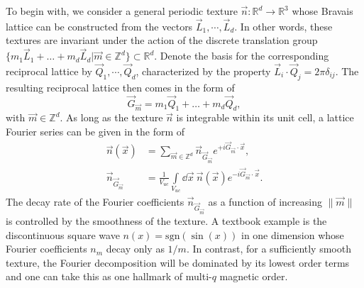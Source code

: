 \documentclass[submission, Phys]{SciPost}
\begin{document}
To begin with, we consider a general periodic texture $\vec{n}\colon \mathbb{R}^d\to \mathbb{R}^3$ whose Bravais lattice can be constructed from the vectors $\vec{L}_1, \cdots, \vec{L}_d$.
In other words, these textures are invariant under the action of the discrete translation group $\{m_1 \vec{L}_1 + \ldots  + m_d \vec{L}_d| \vec{m}\in\mathbb{Z}^d\} \subset \mathbb{R}^d$.
Denote the basis for the corresponding reciprocal lattice by 
$\vec{Q}_1, \cdots, \vec{Q}_d$, characterized by the property $\vec{L}_i \cdot \vec{Q}_j = 2\pi \delta_{ij}$. 
The resulting reciprocal lattice then comes in the form of
\begin{equation}
    \vec{G}_{\vec{m}} = m_1 \vec{Q}_1 + \ldots  + m_d \vec{Q}_d,
    \label{eq:Gm_definition}
\end{equation}
with $\vec{m} \in \mathbb{Z}^d$.
As long as the texture $\vec{n}$ is integrable within its unit cell, a lattice Fourier series can be given in the form  of
\begin{align}
  \vec{n}(\vec{x}) & =  \sum_{\vec{m} \in  \mathbb{Z}^d}  \vec{n}_{ \vec{G}_{\vec{m}}} e^{+ i  \vec{G}_{\vec{m}} \cdot \vec{x} },
  \\
   \vec{n}_{ \vec{G}_{\vec{m}}} & = \frac{1}{V_{uc}} \int\limits_{ V_{uc}} \dd \vec{x} ~ \vec{n}(\vec{x} ) e^{- i  \vec{G}_{\vec{m}} \cdot \vec{x} } .
\end{align}
The decay rate of the Fourier coefficients $\vec{n}_{ \vec{G}_{\vec{m}}}$ as a function of increasing $\| \vec{m} \|$ is controlled by the smoothness of the texture.
A textbook example is the discontinuous square wave $n(x) = \mathrm{sgn}(\sin (x) )$ in one dimension whose Fourier coefficients $n_m$ decay only as $1/m$.
In contrast, for a sufficiently smooth texture, the Fourier decomposition will be dominated by its lowest order terms and one can take this as one hallmark of multi-$q$ magnetic order.
\end{document}
